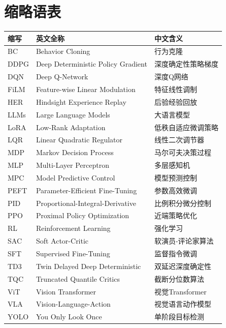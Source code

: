 \chapter*{缩略语表}

\begin{longtable}{p{2.5cm}p{8cm}p{3.5cm}}
\toprule
\textbf{缩写} & \textbf{英文全称} & \textbf{中文含义} \\
\midrule
\endfirsthead

BC & Behavior Cloning & 行为克隆 \\
DDPG & Deep Deterministic Policy Gradient & 深度确定性策略梯度 \\
DQN & Deep Q-Network & 深度Q网络 \\
FiLM & Feature-wise Linear Modulation & 特征线性调制 \\
HER & Hindsight Experience Replay & 后验经验回放 \\
LLMs & Large Language Models & 大语言模型 \\
LoRA & Low-Rank Adaptation & 低秩自适应微调策略 \\
LQR & Linear Quadratic Regulator & 线性二次调节器 \\
MDP & Markov Decision Process & 马尔可夫决策过程 \\
MLP & Multi-Layer Perceptron & 多层感知机 \\
MPC & Model Predictive Control & 模型预测控制 \\
PEFT & Parameter-Efficient Fine-Tuning & 参数高效微调 \\
PID & Proportional-Integral-Derivative & 比例积分微分控制 \\
PPO & Proximal Policy Optimization & 近端策略优化 \\
RL & Reinforcement Learning & 强化学习 \\
SAC & Soft Actor-Critic & 软演员-评论家算法 \\
SFT & Supervised Fine-Tuning & 监督指令微调 \\
TD3 & Twin Delayed Deep Deterministic & 双延迟深度确定性 \\
TQC & Truncated Quantile Critics & 截断分位数算法 \\
ViT & Vision Transformer & 视觉Transformer \\
VLA & Vision-Language-Action & 视觉语言动作模型 \\
YOLO & You Only Look Once & 单阶段目标检测 \\
\bottomrule
\end{longtable}

